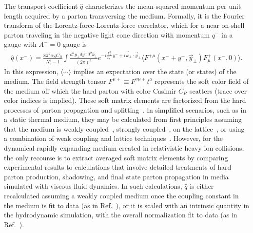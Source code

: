 The transport coefficient $\hat{q}$ characterizes the mean-squared momentum per unit length acquired by a parton transversing the medium.
Formally, it is the Fourier transform of the Lorentz-force-Lorentz-force correlator, 
which for a near on-shell parton traveling in the negative light cone direction with momentum $q^{-}$ in a gauge with $A^{-}=0$ gauge is
\begin{eqnarray}
\hat{q} (x^{-}) = \frac{8\pi^{2} \alpha_{S} C_{R}}{ N_{c}^{2} - 1} \int \frac{d^{2} y_{\perp} dy^{-} d^{2} k_{\perp} }{(2 \pi)^{3}} e^{-i \frac{k_{\perp}^{2} }{2q^{-}} y^{-} + i \vec{k}_{\perp} \cdot \vec{y}_{\perp} }  \langle F^{+ \mu}  (x^{-} + y^{-}, \vec{y}_{\perp}) F^{+}_{\mu}(x^{-},0) \rangle.
\label{Eq:qhat}
\end{eqnarray}
%
In this expression, $\langle \cdots \rangle$ implies an expectation over the state (or states) of the medium. The field strength tensor $F^{\mu +} \equiv F^{a \mu +} t^{a}$ represents 
the soft color field of the medium off which the hard parton with color Casimir $C_{R}$ scatters (trace over color indices is implied). 
These soft matrix elements are 
factorized from the hard processes of parton propagation and splitting~\cite{Kang:2013raa}. In simplified scenarios, such as in a static thermal medium, 
they may be calculated from first principles assuming that the medium is 
weakly coupled~\cite{CaronHuot:2008ni}, strongly coupled~\cite{Liu:2006ug}, on the lattice~\cite{Majumder:2012sh}, or using a combination of weak coupling and 
lattice techniques~\cite{Panero:2013pla}. However, for the dynamical rapidly expanding medium created in relativistic heavy ion collisions, the only recourse is to extract averaged soft matrix elements by comparing experimental results to calculations that involve 
detailed treatments of hard parton production, shadowing, and final state parton propagation in media simulated with viscous fluid dynamics. 
In such calculations, $\hat{q}$ is either recalculated assuming a weakly coupled medium once the coupling constant in the medium is fit to data (as in Ref.~\cite{Gyulassy:2000er,Arnold:2002ja,Qin:2007rn}), or it is scaled with an intrinsic quantity in the hydrodynamic simulation, with the overall normalization fit to data (as in Ref.~\cite{Majumder:2011uk}).  

